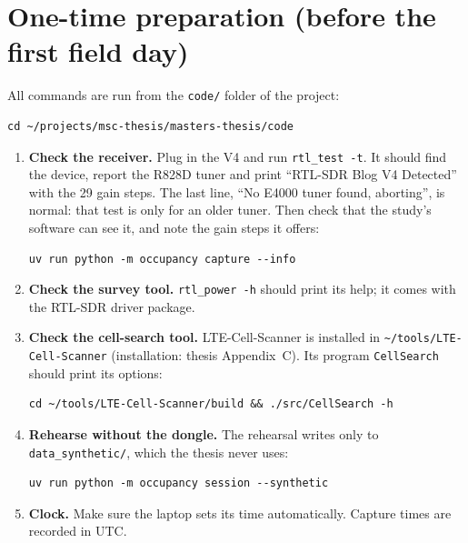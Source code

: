 \documentclass[11pt,a4paper]{article}
\newcommand{\cmd}[1]{\texttt{#1}}
\begin{document}
\section{One-time preparation (before the first field day)}
All commands are run from the \cmd{code/} folder of the project:
\begin{Verbatim}
cd ~/projects/msc-thesis/masters-thesis/code
\end{Verbatim}
\begin{enumerate}
\item \textbf{Check the receiver.} Plug in the V4 and run \cmd{rtl\_test -t}. It should find the device, report the R828D tuner and print ``RTL-SDR Blog V4 Detected'' with the 29 gain steps. The last line, ``No E4000 tuner found, aborting'', is normal: that test is only for an older tuner. Then check that the study's software can see it, and note the gain steps it offers:
\begin{Verbatim}
uv run python -m occupancy capture --info
\end{Verbatim}
\item \textbf{Check the survey tool.} \cmd{rtl\_power -h} should print its help; it comes with the RTL-SDR driver package.
\item \textbf{Check the cell-search tool.} LTE-Cell-Scanner is installed in \cmd{\textasciitilde/tools/LTE-Cell-Scanner} (installation: thesis Appendix~C). Its program \cmd{CellSearch} should print its options:
\begin{Verbatim}
cd ~/tools/LTE-Cell-Scanner/build && ./src/CellSearch -h
\end{Verbatim}
\item \textbf{Rehearse without the dongle.} The rehearsal writes only to \cmd{data\_synthetic/}, which the thesis never uses:
\begin{Verbatim}
uv run python -m occupancy session --synthetic
\end{Verbatim}
\item \textbf{Clock.} Make sure the laptop sets its time automatically. Capture times are recorded in UTC.
\end{enumerate}
\end{document}
